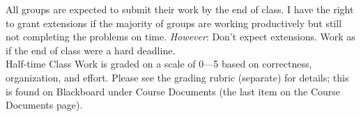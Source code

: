 \documentclass[11pt]{article}
\begin{document}
All groups are expected to submit their work by the end of class. I have the right to grant extensions if the majority of groups are working productively but still not completing the problems on time. \emph{However}: Don't expect extensions. Work as if the end of class were a hard deadline. \\

Half-time Class Work is graded on a scale of 0---5 based on correctness, organization, and effort. Please see the grading rubric (separate) for details; this is found on Blackboard under Course Documents (the last item on the Course Documents page). 
\end{document}

